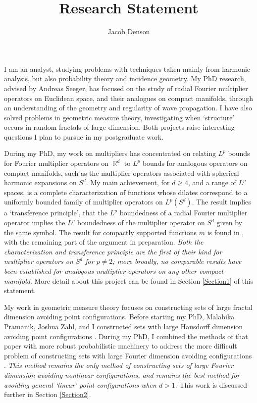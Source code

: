 \documentclass[11pt]{article}
\title{\vspace{-2em}Research Statement}
\author{Jacob Denson}
\date{}
\DeclareMathOperator{\RR}{\mathbb{R}}
\begin{document}
\maketitle

I am an analyst, studying problems with techniques taken mainly from harmonic analysis, but also probability theory and incidence geometry. My PhD research, advised by Andreas Seeger, has focused on the study of radial Fourier multiplier operators on Euclidean space, and their analogues on compact manifolds, through an understanding of the geometry and regularity of wave propagation. I have also solved problems in geometric measure theory, investigating when `structure' occurs in random fractals of large dimension. Both projects raise interesting questions I plan to pursue in my postgraduate work.

During my PhD, my work on multipliers has concentrated on relating $L^p$ bounds for Fourier multiplier operators on $\RR^d$ to $L^p$ bounds for analogous operators on compact manifolds, such as the multiplier operators associated with spherical harmonic expansions on $S^d$. My main achievement, for $d \geq 4$, and a range of $L^p$ spaces, is a complete characterization of functions whose dilates correspond to a uniformly bounded family of multiplier operators on $L^p(S^d)$. The result implies a `transference principle', that the $L^p$ boundedness of a radial Fourier multiplier operator implies the $L^p$ boundedness of the multiplier operator on $S^d$ given by the same symbol. %
The result for compactly supported functions $m$ is found in \cite{DensonCharacterization}, with the remaining part of the argument in preparation. \emph{Both the characterization and transference principle are the first of their kind for multiplier operators on $S^d$ for $p \neq 2$; more broadly, no comparable results have been established for analogous multiplier operators on any other compact manifold}. More detail about this project can be found in Section \ref{Section1} of this statement.

%
%
%
%

My work in geometric measure theory focuses on constructing sets of large fractal dimension avoiding point configurations. Before starting my PhD, Malabika Pramanik, Joshua Zahl, and I constructed sets with large Hausdorff dimension avoiding point configurations \cite{DensonPramanikZahl,DensonThesis}. During my PhD, I combined the methods of that paper with more robust probabilistic machinery to address the more difficult problem of constructing sets with large Fourier dimension avoiding configurations \cite{DensonFourier}. \emph{This method remains the only method of constructing sets of large Fourier dimension avoiding nonlinear configurations, and remains the best method for avoiding general `linear' point configurations when $d > 1$}. This work is discussed further in Section \ref{Section2}.
\end{document}
